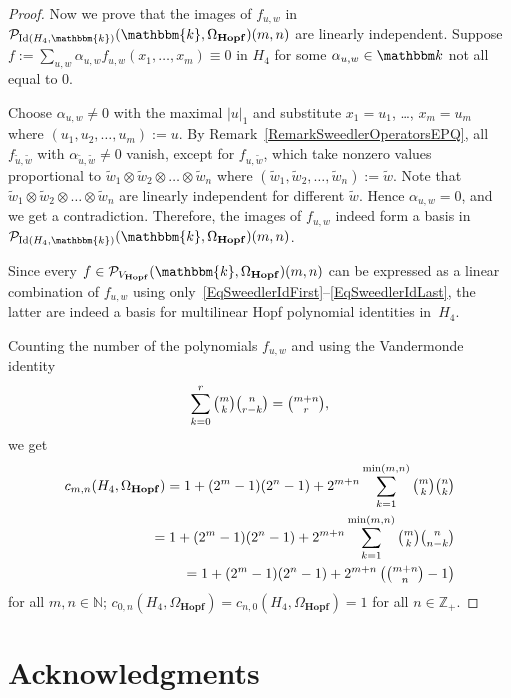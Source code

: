 \documentclass[12pt, reqno, a4paper]{amsart}
\theoremstyle{plain}
\theoremstyle{remark}
\theoremstyle{definition}
\numberwithin{equation}{section}
\DeclareMathOperator{\Id}{Id}
\begin{document}
\begin{proof}
	Now we prove that the images of $f_{u,w}$ in $\mathcal P_{\Id(H_4, \mathbbm{k})}(\mathbbm{k}, \Omega_\mathbf{Hopf})(m,n)$ are linearly independent.
	Suppose $f:=\sum\limits_{u,w} \alpha_{u,w} f_{u,w} (x_1, \ldots, x_m) \equiv 0$ in $H_4$
	for some $\alpha_{u,w} \in \mathbbm k$ not all equal to $0$.
	
	Choose $\alpha_{u,w}\ne 0$ with the maximal $|u|_1$ and substitute $x_1=u_1$, \ldots, $x_m=u_m$
	where $(u_1,u_2,\ldots, u_m):=u$. By Remark~\ref{RemarkSweedlerOperatorsEPQ}, all $f_{\tilde u, \tilde w}$ with $\alpha_{\tilde u,\tilde w}\ne 0$ vanish, except for $f_{u, \tilde w}$, which take nonzero values proportional to $\tilde w_1 \otimes \tilde w_2 \otimes\dots\otimes \tilde w_n$
	where $(\tilde w_1,\tilde w_2,\ldots, \tilde w_n):=\tilde w$. Note that $\tilde w_1 \otimes \tilde w_2 \otimes\dots\otimes \tilde w_n$
	are linearly independent for different $\tilde w$. Hence $\alpha_{u,w}= 0$, and we get a contradiction. Therefore,
	the images of $f_{u,w}$ indeed form a basis in $\mathcal P_{\Id(H_4, \mathbbm{k})}(\mathbbm{k}, \Omega_\mathbf{Hopf})(m,n)$.
	
	Since every $f \in \mathcal P_{V_\mathbf{Hopf}}(\mathbbm{k}, \Omega_\mathbf{Hopf})(m,n)$
	can be expressed as a linear combination of $f_{u,w}$ using only~\eqref{EqSweedlerIdFirst}--\eqref{EqSweedlerIdLast},
	the latter are indeed a basis for multilinear Hopf polynomial identities in~$H_4$. 
	
	Counting the number of the polynomials $f_{u,w}$ and using the Vandermonde identity $$ \sum\limits_{k=0}^{r} \tbinom{m}{k} \tbinom{n}{r-k}
	=\tbinom{m+n}{r},$$ we get
	\begin{equation*}\begin{split}c_{m,n}(H_4,\Omega_\mathbf{Hopf})=1 + (2^m-1)(2^n-1) + 2^{m+n} \sum\limits_{k=1}^{\min(m,n)} \tbinom{m}{k} \tbinom{n}{k}  \\
	=1 + (2^m-1)(2^n-1) + 2^{m+n} \sum\limits_{k=1}^{\min(m,n)} \tbinom{m}{k} \tbinom{n}{n-k}  \\
	 = 1 + (2^m-1)(2^n-1) + 2^{m+n} \left(\tbinom{m+n}{n}-1\right)
	\end{split}
	\end{equation*} for all $m, n\in\mathbb N$;
	$c_{0,n}(H_4,\Omega_\mathbf{Hopf})=c_{n,0}(H_4,\Omega_\mathbf{Hopf})=1$ for all $n\in \mathbb Z_+$.
\end{proof}	


\section*{Acknowledgments}
\end{document}
